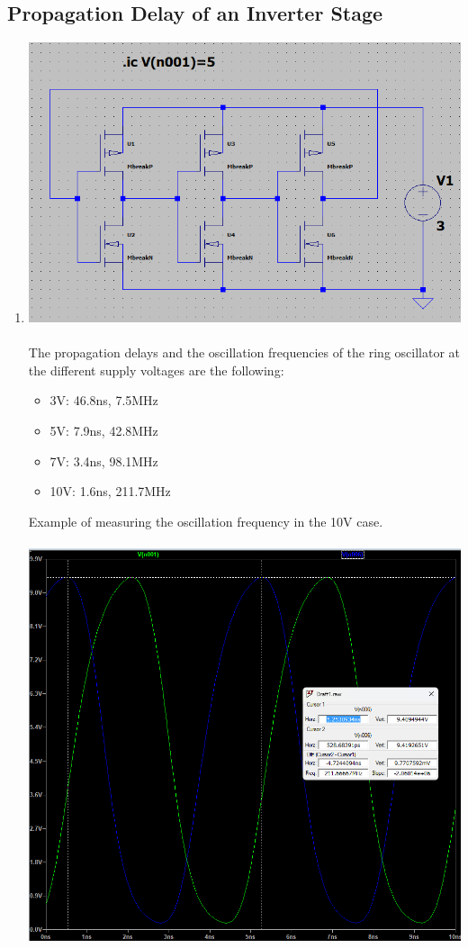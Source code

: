 \documentclass{article}
\begin{document}
		\subsection{Propagation Delay of an Inverter Stage}
		\begin{enumerate}
			\item \includegraphics[scale=0.55]{prelab 6/3 circuit}\\\\
			The propagation delays and the oscillation frequencies of the ring oscillator at the different supply voltages are the following:
				\begin{itemize}
					\item 3V: 46.8ns, 7.5MHz
					\item 5V: 7.9ns, 42.8MHz
					\item 7V: 3.4ns, 98.1MHz
					\item 10V: 1.6ns, 211.7MHz
				\end{itemize}
			Example of measuring the oscillation frequency in the 10V case.\\\\
			\includegraphics[scale=0.55]{prelab 6/3 freq}\\\\

\end{enumerate}
\end{document}
